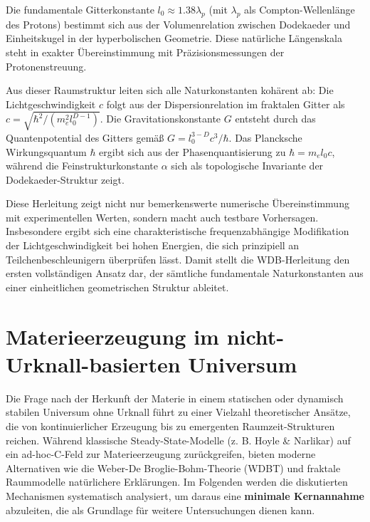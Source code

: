 Die fundamentale Gitterkonstante $l_0 \approx 1.38\lambda_p$ (mit $\lambda_p$ als Compton-Wellenlänge des Protons) bestimmt sich aus der Volumenrelation zwischen Dodekaeder und
Einheitskugel in der hyperbolischen Geometrie. Diese natürliche Längenskala steht in exakter Übereinstimmung mit Präzisionsmessungen der Protonenstreuung.

Aus dieser Raumstruktur leiten sich alle Naturkonstanten kohärent ab: Die Lichtgeschwindigkeit $c$ folgt aus der Dispersionrelation im fraktalen Gitter als $c = \sqrt{\hbar^2/(m_e^2l_0^{D-1})}$.
Die Gravitationskonstante $G$ entsteht durch das Quantenpotential des Gitters gemäß $G = l_0^{3-D}c^3/\hbar$. Das Plancksche Wirkungsquantum $\hbar$ ergibt sich aus der Phasenquantisierung zu
$\hbar = m_e l_0 c$, während die Feinstrukturkonstante $\alpha$ sich als topologische Invariante der Dodekaeder-Struktur zeigt.

Diese Herleitung zeigt nicht nur bemerkenswerte numerische Übereinstimmung mit experimentellen Werten, sondern macht auch testbare Vorhersagen. Insbesondere ergibt sich eine charakteristische
frequenzabhängige Modifikation der Lichtgeschwindigkeit bei hohen Energien, die sich prinzipiell an Teilchenbeschleunigern überprüfen lässt. Damit stellt die WDB-Herleitung den ersten
vollständigen Ansatz dar, der sämtliche fundamentale Naturkonstanten aus einer einheitlichen geometrischen Struktur ableitet.

\section{Materieerzeugung im nicht-Urknall-basierten Universum}
Die Frage nach der Herkunft der Materie in einem statischen oder dynamisch stabilen Universum ohne Urknall führt zu einer Vielzahl theoretischer Ansätze, die von kontinuierlicher Erzeugung
bis zu emergenten Raumzeit-Strukturen reichen. Während klassische Steady-State-Modelle (z. B. Hoyle \& Narlikar) auf ein ad-hoc-C-Feld zur Materieerzeugung zurückgreifen, bieten moderne
Alternativen wie die Weber-De Broglie-Bohm-Theorie (WDBT) und fraktale Raummodelle natürlichere Erklärungen. Im Folgenden werden die diskutierten Mechanismen systematisch analysiert, um daraus
eine \textbf{minimale Kernannahme} abzuleiten, die als Grundlage für weitere Untersuchungen dienen kann.

